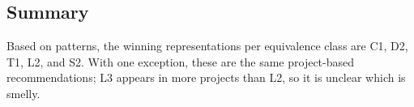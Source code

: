 

\subsection{Summary}
Based on patterns, the winning representations per equivalence class are C1, D2, T1, L2, and S2. With one exception, these are the same project-based recommendations; L3 appears in more projects than L2, so it is unclear which is smelly.
